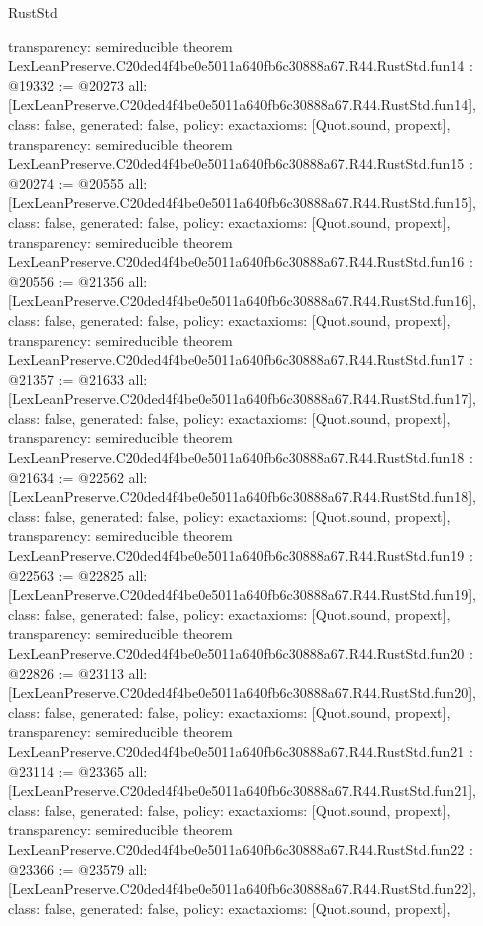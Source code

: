 \begin{lexlean}{RustStd}
\begin{coremodule}
{  transparency: semireducible
}
theorem LexLeanPreserve.C20ded4f4be0e5011a640fb6c30888a67.R44.RustStd.fun14 : @19332 := @20273 {
  all: [LexLeanPreserve.C20ded4f4be0e5011a640fb6c30888a67.R44.RustStd.fun14],
  class: false,
  generated: false,
  policy: exact{axioms: [Quot.sound, propext]},
  transparency: semireducible
}
theorem LexLeanPreserve.C20ded4f4be0e5011a640fb6c30888a67.R44.RustStd.fun15 : @20274 := @20555 {
  all: [LexLeanPreserve.C20ded4f4be0e5011a640fb6c30888a67.R44.RustStd.fun15],
  class: false,
  generated: false,
  policy: exact{axioms: [Quot.sound, propext]},
  transparency: semireducible
}
theorem LexLeanPreserve.C20ded4f4be0e5011a640fb6c30888a67.R44.RustStd.fun16 : @20556 := @21356 {
  all: [LexLeanPreserve.C20ded4f4be0e5011a640fb6c30888a67.R44.RustStd.fun16],
  class: false,
  generated: false,
  policy: exact{axioms: [Quot.sound, propext]},
  transparency: semireducible
}
theorem LexLeanPreserve.C20ded4f4be0e5011a640fb6c30888a67.R44.RustStd.fun17 : @21357 := @21633 {
  all: [LexLeanPreserve.C20ded4f4be0e5011a640fb6c30888a67.R44.RustStd.fun17],
  class: false,
  generated: false,
  policy: exact{axioms: [Quot.sound, propext]},
  transparency: semireducible
}
theorem LexLeanPreserve.C20ded4f4be0e5011a640fb6c30888a67.R44.RustStd.fun18 : @21634 := @22562 {
  all: [LexLeanPreserve.C20ded4f4be0e5011a640fb6c30888a67.R44.RustStd.fun18],
  class: false,
  generated: false,
  policy: exact{axioms: [Quot.sound, propext]},
  transparency: semireducible
}
theorem LexLeanPreserve.C20ded4f4be0e5011a640fb6c30888a67.R44.RustStd.fun19 : @22563 := @22825 {
  all: [LexLeanPreserve.C20ded4f4be0e5011a640fb6c30888a67.R44.RustStd.fun19],
  class: false,
  generated: false,
  policy: exact{axioms: [Quot.sound, propext]},
  transparency: semireducible
}
theorem LexLeanPreserve.C20ded4f4be0e5011a640fb6c30888a67.R44.RustStd.fun20 : @22826 := @23113 {
  all: [LexLeanPreserve.C20ded4f4be0e5011a640fb6c30888a67.R44.RustStd.fun20],
  class: false,
  generated: false,
  policy: exact{axioms: [Quot.sound, propext]},
  transparency: semireducible
}
theorem LexLeanPreserve.C20ded4f4be0e5011a640fb6c30888a67.R44.RustStd.fun21 : @23114 := @23365 {
  all: [LexLeanPreserve.C20ded4f4be0e5011a640fb6c30888a67.R44.RustStd.fun21],
  class: false,
  generated: false,
  policy: exact{axioms: [Quot.sound, propext]},
  transparency: semireducible
}
theorem LexLeanPreserve.C20ded4f4be0e5011a640fb6c30888a67.R44.RustStd.fun22 : @23366 := @23579 {
  all: [LexLeanPreserve.C20ded4f4be0e5011a640fb6c30888a67.R44.RustStd.fun22],
  class: false,
  generated: false,
  policy: exact{axioms: [Quot.sound, propext]},
}
\end{coremodule}
\end{lexlean}
